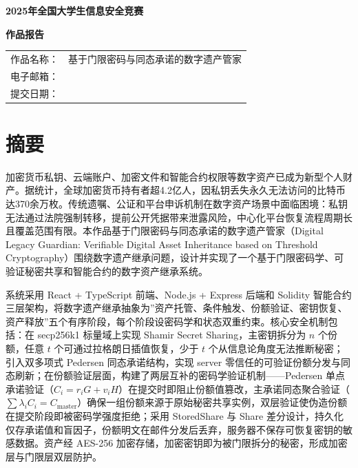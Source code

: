 \documentclass[UTF8,a4paper,zihao=-4,openany]{ctexrep}
\newcommand{\project}{基于门限密码与同态承诺的数字遗产管家}
\newcommand{\englishname}{Digital Legacy Guardian: Verifiable Digital Asset Inheritance based on Threshold Cryptography}
\begin{document}
\songti

\begin{titlepage}
\centering
\vspace*{2.2cm}
{\bfseries 2025年全国大学生信息安全竞赛\par}
\vspace{1.2cm}
{\bfseries 作品报告\par}
\vspace{2.4cm}
\begin{tabular}{rl}
作品名称：& \project\\[0.8cm]
电子邮箱：& \underline{\hspace{8cm}}\\[0.8cm]
提交日期：& \underline{\hspace{8cm}}\\
\end{tabular}
\vfill
\end{titlepage}

\chapter*{摘要}

加密货币私钥、云端账户、加密文件和智能合约权限等数字资产已成为新型个人财产。据统计，全球加密货币持有者超4.2亿人，因私钥丢失永久无法访问的比特币达370余万枚。传统遗嘱、公证和平台申诉机制在数字资产场景中面临困境：私钥无法通过法院强制转移，提前公开凭据带来泄露风险，中心化平台恢复流程周期长且覆盖范围有限。本作品\project（\englishname）围绕数字遗产继承问题，设计并实现了一个基于门限密码学、可验证秘密共享和智能合约的数字资产继承系统。

系统采用 React + TypeScript 前端、Node.js + Express 后端和 Solidity 智能合约三层架构，将数字遗产继承抽象为”资产托管、条件触发、份额验证、密钥恢复、资产释放”五个有序阶段，每个阶段设密码学和状态双重约束。核心安全机制包括：在 secp256k1 标量域上实现 Shamir Secret Sharing，主密钥拆分为 $n$ 个份额，任意 $t$ 个可通过拉格朗日插值恢复，少于 $t$ 个从信息论角度无法推断秘密；引入双多项式 Pedersen 同态承诺结构，实现 server 零信任的可验证份额分发与同态刷新；在份额验证层面，构建了两层互补的密码学验证机制——Pedersen 单点承诺验证（$C_i = r_iG + v_iH$）在提交时即阻止份额值篡改，主承诺同态聚合验证（$\sum \lambda_i C_i = C_{\text{master}}$）确保一组份额来源于原始秘密共享实例，双层验证使伪造份额在提交阶段即被密码学强度拒绝；采用 StoredShare 与 Share 差分设计，持久化仅存承诺值和盲因子，份额明文在邮件分发后丢弃，服务器不保存可恢复密钥的敏感数据。资产经 AES-256 加密存储，加密密钥即为被门限拆分的秘密，形成加密层与门限层双层防护。
\end{document}
